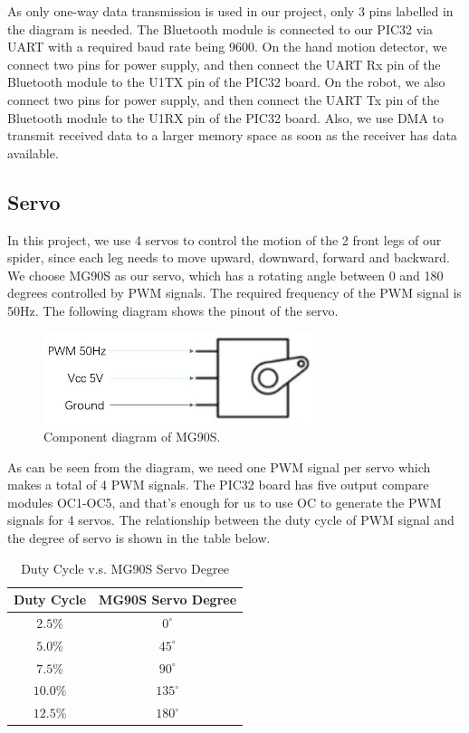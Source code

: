 \documentclass[a4paper]{article}
\begin{document}
As only one-way data transmission is used in our project, only 3 pins labelled in the diagram is needed. The Bluetooth module is connected to our PIC32 via UART with a required baud rate being 9600. On the hand motion detector, we connect two pins for power supply, and then connect the UART Rx pin of the Bluetooth module to the U1TX pin of the PIC32 board. On the robot, we also connect two pins for power supply, and then connect the UART Tx pin of the Bluetooth module to the U1RX pin of the PIC32 board. Also, we use DMA to transmit received data to a larger memory space as soon as the receiver has data available.

\subsection{Servo}
In this project, we use 4 servos to control the motion of the 2 front legs of our spider, since each leg needs to move upward, downward, forward and backward. We choose MG90S as our servo, which has a rotating angle between 0 and 180 degrees controlled by PWM signals. The required frequency of the PWM signal is 50Hz. The following diagram shows the pinout of the servo.

\begin{figure}[H]
    \centering
    \includegraphics[width=0.7\textwidth]{servo.jpg}
    \caption{Component diagram of MG90S.}
\end{figure}

As can be seen from the diagram, we need one PWM signal per servo which makes a total of 4 PWM signals. The PIC32 board has five output compare modules OC1-OC5, and that's enough for us to use OC to generate the PWM signals for 4 servos. The relationship between the duty cycle of PWM signal and the degree of servo is shown in the table below.

\begin{table}[htbp]
    \centering
    \begin{tabular}{cc}    
        \toprule    
            Duty Cycle & MG90S Servo Degree \\    
        \midrule
            $2.5\%$   & $0^\circ$       \\
            $5.0\%$   & $45^\circ$       \\
            $7.5\%$   & $90^\circ$       \\
            $10.0\%$   & $135^\circ$       \\
            $12.5\%$   & $180^\circ$       \\
    \end{tabular}
    \caption{Duty Cycle v.s. MG90S Servo Degree}  
\end{table}
\end{document}
